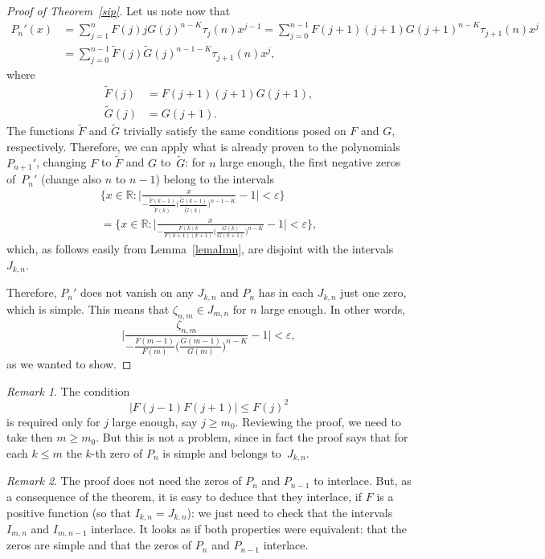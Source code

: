 \documentclass[10pt, a4paper, leqno]{amsart}
\numberwithin{equation}{section}
\theoremstyle{plain}
\theoremstyle{remark}
\newtheorem{Rem}{Remark}[section]
\newcommand{\RR}{\mathbb{R}}
\newcommand{\eps}{\varepsilon}
\begin{document}
\begin{proof}[Proof of Theorem~\ref{sip}]
Let us note now that
\begin{align*}
  P_n'(x) &= \sum_{j=1}^n F(j) j G(j)^{n-K} \tau_j(n) x^{j-1}
  = \sum_{j=0}^{n-1} F(j+1)(j+1) G(j+1)^{n-K} \tau_{j+1}(n) x^j
  \\
  &= \sum_{j=0}^{n-1} \widetilde{F}(j) \widetilde{G}(j)^{n-1-K} \tau_{j+1}(n) x^j,
\end{align*}
where
\begin{align*}
  \widetilde{F}(j) &= F(j+1) (j+1) G(j+1),
  \\
  \widetilde{G}(j) &= G(j+1).
\end{align*}
The functions $\widetilde{F}$ and $\widetilde{G}$ trivially satisfy the same conditions posed on $F$ and $G$, respectively. Therefore, we can apply what is already proven to the polynomials $P_{n+1}'$, changing $F$ to $\widetilde{F}$ and $G$ to~$\widetilde{G}$: for $n$ large enough, the first negative zeros of~$P_n'$ (change also $n$ to $n-1$) belong to the intervals
\begin{multline*}
  \Bigg\{ x \in \RR : \Bigg| \frac{x}{-\frac{\widetilde{F}(k-1)}{\widetilde{F}(k)} 
  \Big(\frac{\widetilde{G}(k-1)}{\widetilde{G}(k)}\Big)^{n-1-K}} - 1 \Bigg| < \eps
  \Bigg\}
  \\
  = \Bigg\{ x \in \RR : \Bigg| \frac{x}{-\frac{F(k) k}{F(k+1) (k+1)} 
  \Big(\frac{G(k)}{G(k+1)}\Big)^{n-K}} - 1 \Bigg| < \eps
  \Bigg\},
\end{multline*}
which, as follows easily from Lemma~\ref{lemaImn}, are disjoint with the intervals~$J_{k,n}$.

Therefore, $P_n'$ does not vanish on any $J_{k,n}$ and $P_n$ has in each $J_{k,n}$ just one zero, which is simple.
This means that $\zeta_{n,m} \in J_{m,n}$ for $n$ large enough. In other words,
\[
  \Bigg|
  \frac{\zeta_{n,m}}{
  -\frac{F(m-1)}{F(m)} \Big(\frac{G(m-1)}{G(m)}\Big)^{n-K}
  } -1
  \Bigg|
  < \eps,
\]
as we wanted to show.
\end{proof}

\begin{Rem}
\label{RemFjgrande}
The condition
\[
  |F(j-1) F(j+1)| \le F(j)^2
\]
is required only for $j$ large enough, say $j \ge m_0$. Reviewing the proof, we need to take then $m \ge m_0$. But this is not a problem, since in fact the proof says that for each $k \le m$ the $k$-th zero of $P_n$ is simple and belongs to~$J_{k,n}$.
\end{Rem}

\begin{Rem}
The proof does not need the zeros of $P_n$ and $P_{n-1}$ to interlace. But, as a consequence of the theorem, it is easy to deduce that they interlace, if $F$ is a positive function (so that $I_{k,n} = J_{k,n}$): we just need to check that the intervals $I_{m,n}$ and $I_{m,n-1}$ interlace. It looks as if both properties were equivalent: that the zeros are simple and that the zeros of $P_n$ and $P_{n-1}$ interlace.
\end{Rem}
\end{document}
